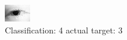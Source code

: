 \begin{figure}[h!]
\begin{center}
\includegraphics[width=0.60\columnwidth]{figures/ID165_class_4_target_3.png}
\end{center}
\caption{ Classification: 4 actual target: 3}
\label{fig:ID165_class_4_target_3}
\end{figure}
